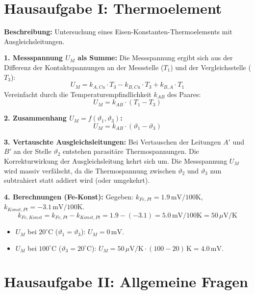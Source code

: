 \documentclass{article}
\begin{document}
\section*{Hausaufgabe I: Thermoelement}

\textbf{Beschreibung:} Untersuchung eines Eisen-Konstanten-Thermoelements mit Ausgleichsleitungen.

\textbf{1. Messspannung $U_M$ als Summe:}
Die Messspannung ergibt sich aus der Differenz der Kontaktspannungen an der Messstelle ($T_1$) und der Vergleichsstelle ($T_3$):
\[ U_M = k_{A,Cu} \cdot T_3 - k_{B,Cu} \cdot T_3 + k_{B,A} \cdot T_1 \]
Vereinfacht durch die Temperaturempfindlichkeit $k_{AB}$ des Paares:
\[ U_M = k_{AB} \cdot (T_1 - T_3) \]

\textbf{2. Zusammenhang $U_M = f(\vartheta_1, \vartheta_3)$:}
\[ U_M = k_{AB} \cdot (\vartheta_1 - \vartheta_3) \]

\textbf{3. Vertauschte Ausgleichsleitungen:}
Bei Vertauschen der Leitungen $A'$ und $B'$ an der Stelle $\vartheta_2$ entstehen parasitäre Thermospannungen. Die Korrekturwirkung der Ausgleichsleitung kehrt sich um. Die Messspannung $U_M$ wird massiv verfälscht, da die Thermospannung zwischen $\vartheta_2$ und $\vartheta_3$ nun subtrahiert statt addiert wird (oder umgekehrt).

\textbf{4. Berechnungen (Fe-Konst):}
Gegeben: $k_{Fe,Pt} = 1.9\,\text{mV}/100\text{K}$, $k_{Konst,Pt} = -3.1\,\text{mV}/100\text{K}$.
\[ k_{Fe,Konst} = k_{Fe,Pt} - k_{Konst,Pt} = 1.9 - (-3.1) = 5.0\,\text{mV}/100\text{K} = 50\,\mu\text{V}/\text{K} \]
\begin{itemize}
    \item $U_M$ bei $20^\circ\text{C}$ ($\vartheta_1 = \vartheta_3$): $U_M = 0\,\text{mV}$.
    \item $U_M$ bei $100^\circ\text{C}$ ($\vartheta_3 = 20^\circ\text{C}$): $U_M = 50\,\mu\text{V}/\text{K} \cdot (100 - 20)\,\text{K} = 4.0\,\text{mV}$.
\end{itemize}

\section*{Hausaufgabe II: Allgemeine Fragen}
\end{document}
